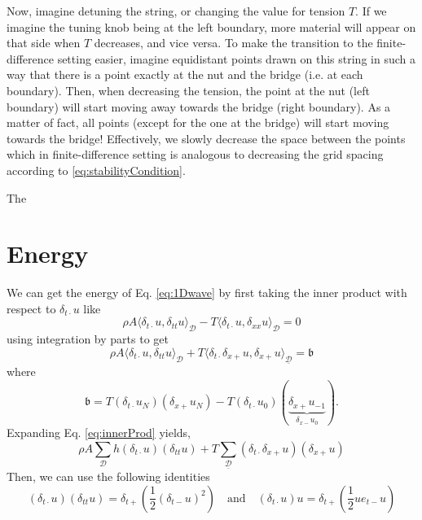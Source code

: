 \documentclass[dvipsnames]{article}
\begin{document}
Now, imagine detuning the string, or changing the value for tension $T$. If we imagine the tuning knob being at the left boundary, more material will appear on that side when $T$ decreases, and vice versa. To make the transition to the finite-difference setting easier, imagine equidistant points drawn on this string in such a way that there is a point exactly at the nut and the bridge (i.e. at each boundary). Then, when decreasing the tension, the point at the nut (left boundary) will start moving away towards the bridge (right boundary). As a matter of fact, all points (except for the one at the bridge) will start moving towards the bridge! Effectively, we slowly decrease the space between the points which in finite-difference setting is analogous to decreasing the grid spacing according to \eqref{eq:stabilityCondition}. 

The  


\section{Energy}
We can get the energy of Eq. \eqref{eq:1Dwave} by first taking the inner product with respect to $\delta_{t\cdot}u$ like
\begin{equation}
    \rho A\langle \delta_{t\cdot}u, \delta_{tt}u\rangle_\mathcal{D} - T \langle \delta_{t\cdot}u,\delta_{xx}u\rangle_\mathcal{D} = 0
\end{equation}
using integration by parts to get
\begin{equation}\label{eq:innerProd}
    \rho A\langle \delta_{t\cdot}u, \delta_{tt}u\rangle_\mathcal{D} + T \langle \delta_{t\cdot}\delta_{x+}u,\delta_{x+}u\rangle_{\underline{\mathcal{D}}} = \mathfrak{b}
\end{equation}
where
\begin{equation}
    \mathfrak{b} = T (\delta_{t\cdot}u_N)(\delta_{x+}u_N) - T(\delta_{t\cdot}u_0)(\underbrace{\delta_{x+}u_{-1}}_{\delta_{x-}u_0}).
\end{equation}
Expanding Eq. \eqref{eq:innerProd} yields,
\begin{equation}
    \rho A \sum_\mathcal{D}h(\delta_{t\cdot}u)(\delta_{tt}u) + T \sum_{\underline{\mathcal{D}}}(\delta_{t\cdot}\delta_{x+}u)(\delta_{x+}u)
\end{equation}
Then, we can use the following identities  
\begin{equation}
    (\delta_{t\cdot}u)(\delta_{tt}u) = \delta_{t+}\left(\frac{1}{2}(\delta_{t-}u)^2\right) \quad \text{and} \quad (\delta_{t\cdot}u)u = \delta_{t+}\left(\frac{1}{2}u e_{t-}u\right)
\end{equation}
\end{document}
